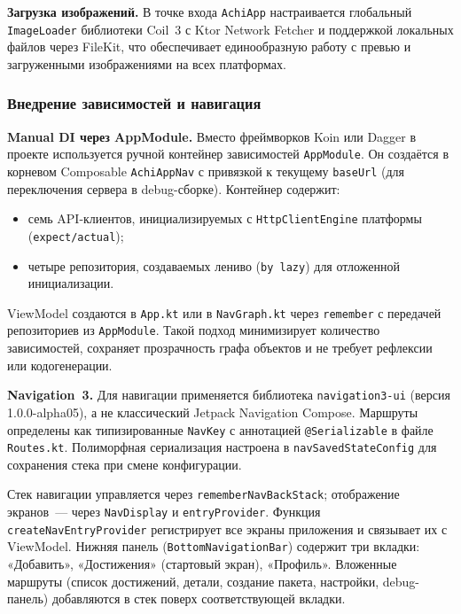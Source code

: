 \documentclass[../main.tex]{subfiles}
\begin{document}
\textbf{Загрузка изображений.} В точке входа \texttt{AchiApp} настраивается глобальный \texttt{ImageLoader} библиотеки Coil~3 с Ktor Network Fetcher и поддержкой локальных файлов через FileKit, что обеспечивает единообразную работу с превью и загруженными изображениями на всех платформах.

\subsubsection{Внедрение зависимостей и навигация}

\textbf{Manual DI через AppModule.} Вместо фреймворков Koin или Dagger в проекте используется ручной контейнер зависимостей \texttt{AppModule}. Он создаётся в корневом Composable \texttt{AchiAppNav} с привязкой к текущему \texttt{baseUrl} (для переключения сервера в debug-сборке). Контейнер содержит:
\begin{itemize}[leftmargin=*]
	\item семь API-клиентов, инициализируемых с \texttt{HttpClientEngine} платформы (\texttt{expect/actual});
	\item четыре репозитория, создаваемых лениво (\texttt{by lazy}) для отложенной инициализации.
\end{itemize}

ViewModel создаются в \texttt{App.kt} или в \texttt{NavGraph.kt} через \texttt{remember} с передачей репозиториев из \texttt{AppModule}. Такой подход минимизирует количество зависимостей, сохраняет прозрачность графа объектов и не требует рефлексии или кодогенерации.

\textbf{Navigation~3.} Для навигации применяется библиотека \texttt{navigation3-ui} (версия 1.0.0-alpha05), а не классический Jetpack Navigation Compose. Маршруты определены как типизированные \texttt{NavKey} с аннотацией \texttt{@Serializable} в файле \texttt{Routes.kt}. Полиморфная сериализация настроена в \texttt{navSavedStateConfig} для сохранения стека при смене конфигурации.

Стек навигации управляется через \texttt{rememberNavBackStack}; отображение экранов~--- через \texttt{NavDisplay} и \texttt{entryProvider}. Функция \texttt{createNavEntryProvider} регистрирует все экраны приложения и связывает их с ViewModel. Нижняя панель (\texttt{BottomNavigationBar}) содержит три вкладки: «Добавить», «Достижения» (стартовый экран), «Профиль». Вложенные маршруты (список достижений, детали, создание пакета, настройки, debug-панель) добавляются в стек поверх соответствующей вкладки.
\end{document}
